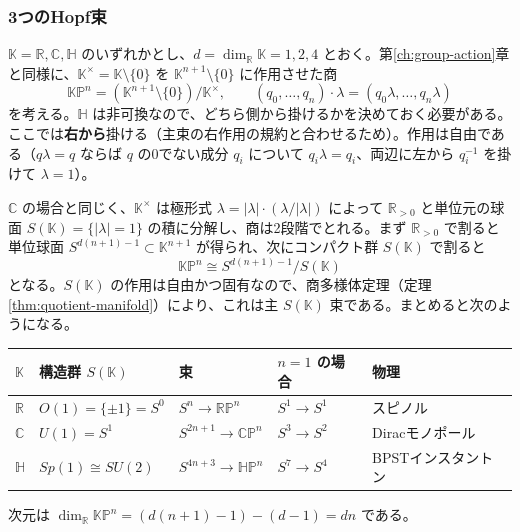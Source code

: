 \documentclass[uplatex, dvipdfmx, book]{jsbook}
\let\origsubsubsection\subsubsection
\renewcommand{\subsection}{\origsubsubsection}
\renewcommand{\subsubsection}{\paragraph}
\begin{document}
\subsection{3つのHopf束}

$\mathbb{K} = \mathbb{R}, \mathbb{C}, \mathbb{H}$ のいずれかとし、$d = \dim_{\mathbb{R}}\mathbb{K} = 1, 2, 4$ とおく。第\ref{ch:group-action}章と同様に、$\mathbb{K}^\times = \mathbb{K} \setminus \{0\}$ を $\mathbb{K}^{n+1} \setminus \{0\}$ に作用させた商
\begin{equation}
    \mathbb{KP}^n = (\mathbb{K}^{n+1} \setminus \{0\}) / \mathbb{K}^\times, \qquad (q_0, \dots, q_n) \cdot \lambda = (q_0\lambda, \dots, q_n\lambda)
\end{equation}
を考える。$\mathbb{H}$ は非可換なので、どちら側から掛けるかを決めておく必要がある。ここでは\textbf{右から}掛ける（主束の右作用の規約と合わせるため）。作用は自由である（$q\lambda = q$ ならば $q$ の0でない成分 $q_i$ について $q_i\lambda = q_i$、両辺に左から $q_i^{-1}$ を掛けて $\lambda = 1$）。

$\mathbb{C}$ の場合と同じく、$\mathbb{K}^\times$ は極形式 $\lambda = |\lambda| \cdot (\lambda/|\lambda|)$ によって $\mathbb{R}_{>0}$ と単位元の球面 $S(\mathbb{K}) = \{|\lambda| = 1\}$ の積に分解し、商は2段階でとれる。まず $\mathbb{R}_{>0}$ で割ると単位球面 $S^{d(n+1) - 1} \subset \mathbb{K}^{n+1}$ が得られ、次にコンパクト群 $S(\mathbb{K})$ で割ると
\begin{equation}
    \mathbb{KP}^n \cong S^{d(n+1) - 1} / S(\mathbb{K})
\end{equation}
となる。$S(\mathbb{K})$ の作用は自由かつ固有なので、商多様体定理（定理\ref{thm:quotient-manifold}）により、これは主 $S(\mathbb{K})$ 束である。まとめると次のようになる。
\begin{center}
\begin{tabular}{lllll}
    \hline
    $\mathbb{K}$ & 構造群 $S(\mathbb{K})$ & 束 & $n = 1$ の場合 & 物理 \\
    \hline
    $\mathbb{R}$ & $O(1) = \{\pm 1\} = S^0$ & $S^n \to \mathbb{RP}^n$ & $S^1 \to S^1$ & スピノル \\
    $\mathbb{C}$ & $U(1) = S^1$ & $S^{2n+1} \to \mathbb{CP}^n$ & $S^3 \to S^2$ & Diracモノポール \\
    $\mathbb{H}$ & $Sp(1) \cong SU(2)$ & $S^{4n+3} \to \mathbb{HP}^n$ & $S^7 \to S^4$ & BPSTインスタントン \\
    \hline
\end{tabular}
\end{center}
次元は $\dim_{\mathbb{R}} \mathbb{KP}^n = (d(n+1) - 1) - (d - 1) = dn$ である。
\end{document}

